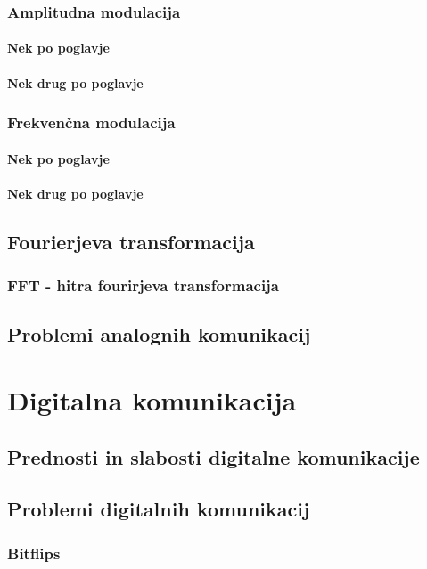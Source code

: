 \documentclass[12pt]{report}
\begin{document}
\subsubsection{Amplitudna modulacija}
\paragraph{Nek po poglavje}
\paragraph{Nek drug po poglavje}
\subsubsection{Frekvenčna modulacija}
\paragraph{Nek po poglavje}
\paragraph{Nek drug po poglavje}

\newpage
\subsection{Fourierjeva transformacija}
\subsubsection{FFT - hitra fourirjeva transformacija}
\subsection{Problemi analognih komunikacij}

\newpage
\section{Digitalna komunikacija}
\subsection{Prednosti in slabosti digitalne komunikacije}
\subsection{Problemi digitalnih komunikacij}
\subsubsection{Bitflips}
\end{document}

